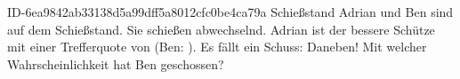 \begin{exercise}
      {ID-6ea9842ab33138d5a99dff5a8012cfc0be4ca79a}
      {Schießstand}
  \ifproblem\problem
    Adrian und Ben sind auf dem Schießstand. Sie schießen abwechselnd. Adrian
    ist der bessere Schütze mit einer Trefferquote von  (Ben: ).
    Es fällt ein Schuss: Daneben! Mit welcher Wahrscheinlichkeit hat Ben
    geschossen?
  \fi
\end{exercise}
